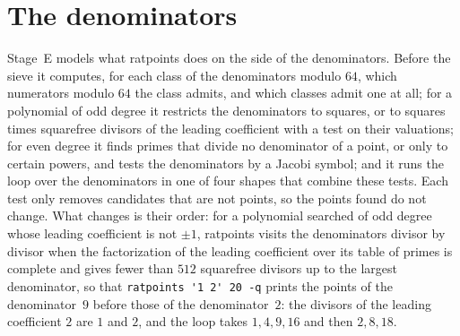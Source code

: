 \chapter{The denominators}\label{chap:denominators}

Stage~E models what ratpoints does on the side of the denominators. Before the sieve it computes,
for each class of the denominators modulo $64$, which numerators modulo $64$ the class admits, and
which classes admit one at all; for a polynomial of odd degree it restricts the denominators to
squares, or to squares times squarefree divisors of the leading coefficient with a test on their
valuations; for even degree it finds primes that divide no denominator of a point, or only to
certain powers, and tests the denominators by a Jacobi symbol; and it runs the loop over the
denominators in one of four shapes that combine these tests. Each test only removes candidates that
are not points, so the points found do not change. What changes is their order: for a polynomial
searched of odd degree whose leading coefficient is not $\pm 1$, ratpoints visits the denominators
divisor by divisor when the factorization of the leading coefficient over its table of primes is
complete and gives fewer than $512$ squarefree divisors up to the largest denominator, so that
\verb|ratpoints '1 2' 20 -q| prints the points of the denominator~$9$ before those of the
denominator~$2$: the divisors of the leading coefficient $2$ are $1$ and $2$, and the loop takes $1,
4, 9, 16$ and then $2, 8, 18$.


